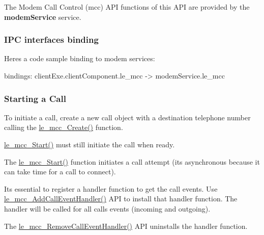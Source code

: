 The Modem Call Control (mcc) A\+P\+I functions of this A\+P\+I are provided by the {\bfseries modem\+Service} service.\hypertarget{c_mcc_le_mcc_binding}{}\subsubsection{I\+P\+C interfaces binding}\label{c_mcc_le_mcc_binding}
Here\textquotesingle{}s a code sample binding to modem services\+: \begin{DoxyVerb}bindings:
{
   clientExe.clientComponent.le_mcc -> modemService.le_mcc
}
\end{DoxyVerb}
\hypertarget{c_mcc_le_mcc_starting_a_call}{}\subsubsection{Starting a Call}\label{c_mcc_le_mcc_starting_a_call}
To initiate a call, create a new call object with a destination telephone number calling the \hyperlink{le__mcc__interface_8h_aeee65430506230b5744701d08ff8dac4}{le\+\_\+mcc\+\_\+\+Create()} function.

\hyperlink{le__mcc__interface_8h_a72a32869bb23864b3e86c606368bed70}{le\+\_\+mcc\+\_\+\+Start()} must still initiate the call when ready.

The \hyperlink{le__mcc__interface_8h_a72a32869bb23864b3e86c606368bed70}{le\+\_\+mcc\+\_\+\+Start()} function initiates a call attempt (it\textquotesingle{}s asynchronous because it can take time for a call to connect).

It\textquotesingle{}s essential to register a handler function to get the call events. Use \hyperlink{le__mcc__interface_8h_ab826cf4b9e3911e659a90d483081e7fe}{le\+\_\+mcc\+\_\+\+Add\+Call\+Event\+Handler()} A\+P\+I to install that handler function. The handler will be called for all calls\textquotesingle{} events (incoming and outgoing).

The \hyperlink{le__mcc__interface_8h_a8a12dc6f1707cf52818d9c2d8281630c}{le\+\_\+mcc\+\_\+\+Remove\+Call\+Event\+Handler()} A\+P\+I uninstalls the handler function.

